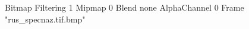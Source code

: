 {Bitmap
	{Filtering 1}
	{Mipmap 0}
	{Blend none}
	{AlphaChannel 0}
	{Frame "rus_specnaz.tif.bmp"}
}
